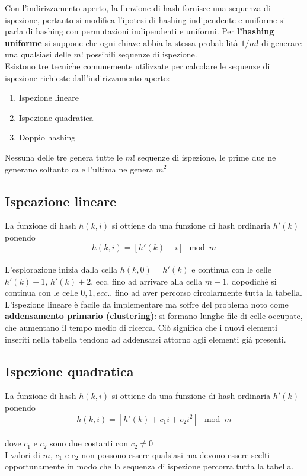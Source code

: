 \noindent Con l'indirizzamento aperto, la funzione di hash fornisce una sequenza di ispezione, 
pertanto si modifica l'ipotesi di hashing indipendente e uniforme si parla di hashing con 
permutazioni indipendenti e uniformi. Per \textbf{l'hashing uniforme} si suppone che ogni chiave abbia la stessa 
probabilità $1/m!$ di generare una qualsiasi delle $m!$ possibili sequenze di ispezione.\\
Esistono tre tecniche comunemente utilizzate per calcolare le sequenze di ispezione richieste 
dall'indirizzamento aperto:
\begin{enumerate}
    \item Ispezione lineare
    \item Ispezione quadratica
    \item Doppio hashing
\end{enumerate}
\noindent Nessuna delle tre genera tutte le $m!$ sequenze di ispezione, le prime due ne generano soltanto $m$ e l’ultima ne genera $m^2$
\subsection{Ispeazione lineare}
La funzione di hash $h(k,i)$ si ottiene da una funzione di hash ordinaria $h'(k)$
ponendo\\
$$ h(k,i) = [h'(k)+i] \mod m $$\\
L’esplorazione inizia dalla cella $h( k,0) = h'(k)$ e continua con le celle $h'(k)+1$,
$h'(k)+2$, ecc. fino ad arrivare alla cella $m-1$, dopodiché si continua con le celle
$0,1,ecc..$ fino ad aver percorso circolarmente tutta la tabella.\\
L’ispezione lineare è facile da implementare ma soffre del problema noto 
come \textbf{addensamento primario (clustering)}: si formano lunghe file di celle occupate, 
che aumentano il tempo medio di ricerca. Ciò significa che i nuovi elementi inseriti 
nella tabella tendono ad addensarsi attorno agli elementi già presenti.
\subsection{Ispezione quadratica}
La funzione di hash $h(k, i)$ si ottiene da una funzione di hash ordinaria $h'(k)$
ponendo\\
$$ h(k,i)=[h'(k)+c_1 i+ c_2 i^2] \mod m$$\\
dove $c_1$ e $c_2$ sono due costanti con $c_2 \neq 0$\\
I valori di $m$, $c_1$ e $c_2$ non possono essere qualsiasi ma devono essere scelti
opportunamente in modo che la sequenza di ispezione percorra tutta la tabella.
